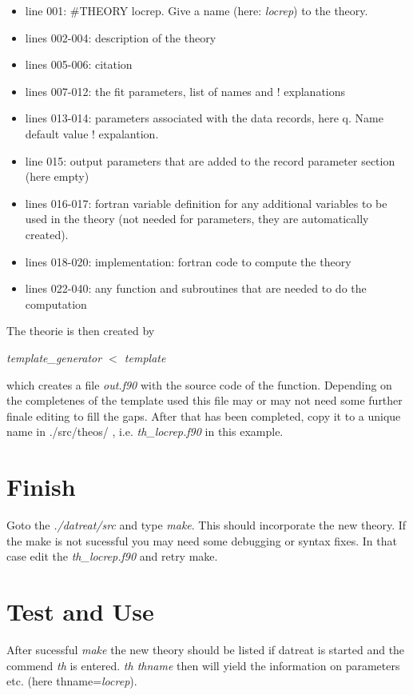 \documentclass{article}
\begin{document}
\begin{itemize}
\item line 001:  \#THEORY locrep. Give a name (here: \emph{locrep}) to the theory.
\item lines 002-004: description of the theory
\item lines 005-006: citation 
\item lines 007-012: the fit parameters, list of names  and ! explanations
\item lines 013-014: parameters associated with the data records, here q. Name default value ! expalantion.
\item line 015: output parameters that are added to the record parameter section (here empty)
\item lines 016-017: fortran variable definition for any additional variables to be used in the theory
       (not needed for parameters, they are automatically created).
\item lines 018-020: implementation: fortran code to compute the theory
\item lines 022-040: any function and subroutines that are needed to do the computation

\end{itemize}

The theorie is then created by 

\emph{template\_generator ${<}$ template}

which creates a file \emph{out.f90} with the source code of the function.
Depending on the completenes of the template used this file may or may not need some further
finale editing to fill the gaps.
After that has been completed, copy it to a unique name in ./src/theos/ , i.e. \emph{th\_locrep.f90}
in this example.


\section{Finish}
\label{sec:finish}

Goto the \emph{./datreat/src} and type \emph{make}. This should incorporate the new
theory. If the make is not sucessful you may need some debugging or syntax fixes.
In that case edit the \emph{th\_locrep.f90} and retry make. 


\section{Test and Use}
\label{sec:testuse}

After sucessful \emph{make} the new theory should be listed if datreat is started
and the commend \emph{th} is entered. \emph{th thname} then will yield the information
on parameters etc. (here thname=\emph{locrep}).
\end{document}
